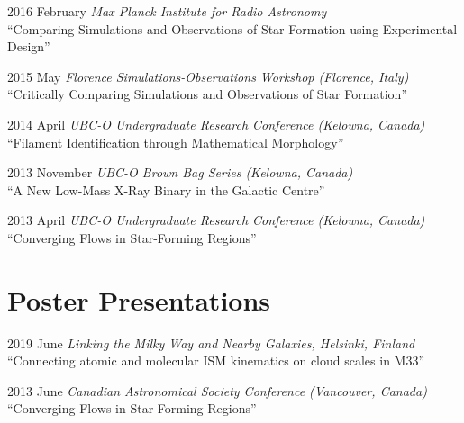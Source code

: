 \documentclass[letterpaper,11pt]{article}
\newlength{\mainindent} \setlength{\mainindent}{12pt}
\newlength{\contentindent} \setlength{\contentindent}{19ex}
\newenvironment{datelist}{
  \begingroup
  \raggedright
  \begin{description}[labelindent=\mainindent,leftmargin=\contentindent,
      style=sameline,font=\normalfont,topsep=0pt,partopsep=0pt,parsep=0pt,
      itemsep=4pt]
}{
  \end{description}
  \endgroup
}
\begin{document}
\begin{datelist}
\item[2016 February] \emph{Max Planck Institute for Radio Astronomy} \\ ``Comparing Simulations and Observations of Star Formation using Experimental Design''
\item[2015 May] \emph{Florence Simulations-Observations Workshop (Florence, Italy)} \\ ``Critically Comparing Simulations and Observations of Star Formation''
\item[2014 April] \emph{UBC-O Undergraduate Research Conference (Kelowna, Canada)} \\ ``Filament Identification through Mathematical Morphology''
\item[2013 November] \emph{UBC-O Brown Bag Series (Kelowna, Canada)} \\ ``A New Low-Mass X-Ray Binary in the Galactic Centre''
\item[2013 April] \emph{UBC-O Undergraduate Research Conference (Kelowna, Canada)} \\ ``Converging Flows in Star-Forming Regions''
\end{datelist}

\section*{Poster Presentations}
\begin{datelist}
\item[2019 June] \emph{Linking the Milky Way and Nearby Galaxies, Helsinki, Finland} \\ ``Connecting atomic and molecular ISM kinematics on cloud scales in M33''
\item[2013 June] \emph{Canadian Astronomical Society Conference (Vancouver, Canada)} \\ ``Converging Flows in Star-Forming Regions''
\end{datelist}


\end{document}

